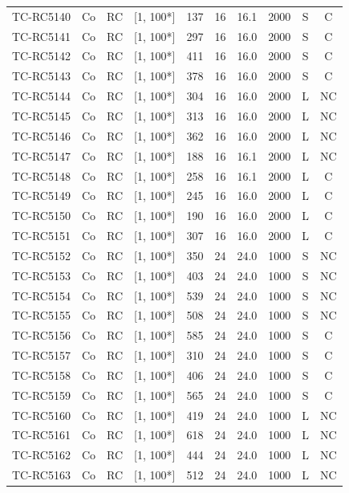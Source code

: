 \begin{longtable}{lccccccccc}
TC-RC5140 & Co & RC & [1, 100*] & 137 & 16 & 16.1 & 2000 & S & C \\
TC-RC5141 & Co & RC & [1, 100*] & 297 & 16 & 16.0 & 2000 & S & C \\
TC-RC5142 & Co & RC & [1, 100*] & 411 & 16 & 16.0 & 2000 & S & C \\
TC-RC5143 & Co & RC & [1, 100*] & 378 & 16 & 16.0 & 2000 & S & C \\
TC-RC5144 & Co & RC & [1, 100*] & 304 & 16 & 16.0 & 2000 & L & NC \\
TC-RC5145 & Co & RC & [1, 100*] & 313 & 16 & 16.0 & 2000 & L & NC \\
TC-RC5146 & Co & RC & [1, 100*] & 362 & 16 & 16.0 & 2000 & L & NC \\
TC-RC5147 & Co & RC & [1, 100*] & 188 & 16 & 16.1 & 2000 & L & NC \\
TC-RC5148 & Co & RC & [1, 100*] & 258 & 16 & 16.1 & 2000 & L & C \\
TC-RC5149 & Co & RC & [1, 100*] & 245 & 16 & 16.0 & 2000 & L & C \\
TC-RC5150 & Co & RC & [1, 100*] & 190 & 16 & 16.0 & 2000 & L & C \\
TC-RC5151 & Co & RC & [1, 100*] & 307 & 16 & 16.0 & 2000 & L & C \\
TC-RC5152 & Co & RC & [1, 100*] & 350 & 24 & 24.0 & 1000 & S & NC \\
TC-RC5153 & Co & RC & [1, 100*] & 403 & 24 & 24.0 & 1000 & S & NC \\
TC-RC5154 & Co & RC & [1, 100*] & 539 & 24 & 24.0 & 1000 & S & NC \\
TC-RC5155 & Co & RC & [1, 100*] & 508 & 24 & 24.0 & 1000 & S & NC \\
TC-RC5156 & Co & RC & [1, 100*] & 585 & 24 & 24.0 & 1000 & S & C \\
TC-RC5157 & Co & RC & [1, 100*] & 310 & 24 & 24.0 & 1000 & S & C \\
TC-RC5158 & Co & RC & [1, 100*] & 406 & 24 & 24.0 & 1000 & S & C \\
TC-RC5159 & Co & RC & [1, 100*] & 565 & 24 & 24.0 & 1000 & S & C \\
TC-RC5160 & Co & RC & [1, 100*] & 419 & 24 & 24.0 & 1000 & L & NC \\
TC-RC5161 & Co & RC & [1, 100*] & 618 & 24 & 24.0 & 1000 & L & NC \\
TC-RC5162 & Co & RC & [1, 100*] & 444 & 24 & 24.0 & 1000 & L & NC \\
TC-RC5163 & Co & RC & [1, 100*] & 512 & 24 & 24.0 & 1000 & L & NC \\

\end{longtable}
